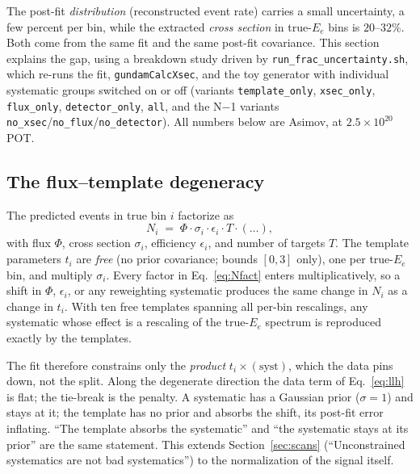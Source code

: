 \documentclass[11pt]{article}
\newcommand{\code}[1]{\texttt{#1}}
\begin{document}
The post-fit \emph{distribution} (reconstructed event rate) carries a small
uncertainty, a few percent per bin, while the extracted \emph{cross section} in
true-$E_e$ bins is $20$--$32\%$. Both come from the same fit and the same
post-fit covariance. This section explains the gap, using a breakdown study
driven by \code{run\_frac\_uncertainty.sh}, which re-runs the fit,
\code{gundamCalcXsec}, and the toy generator with individual systematic groups
switched on or off (variants \code{template\_only}, \code{xsec\_only},
\code{flux\_only}, \code{detector\_only}, \code{all}, and the N$-$1 variants
\code{no\_xsec}/\code{no\_flux}/\code{no\_detector}). All numbers below are
Asimov, at $2.5\times10^{20}$ POT.

\subsection{The flux--template degeneracy}

The predicted events in true bin $i$ factorize as
\begin{equation}
  N_i \;=\; \Phi \cdot \sigma_i \cdot \epsilon_i \cdot T \cdot (\dots),
  \label{eq:Nfact}
\end{equation}
with flux $\Phi$, cross section $\sigma_i$, efficiency $\epsilon_i$, and number
of targets $T$. The template parameters $t_i$ are \emph{free} (no prior
covariance; bounds $[0,3]$ only), one per true-$E_e$ bin, and multiply
$\sigma_i$. Every factor in Eq.~\eqref{eq:Nfact} enters multiplicatively, so a
shift in $\Phi$, $\epsilon_i$, or any reweighting systematic produces the same
change in $N_i$ as a change in $t_i$. With ten free templates spanning all
per-bin rescalings, any systematic whose effect is a rescaling of the
true-$E_e$ spectrum is reproduced exactly by the templates.

The fit therefore constrains only the \emph{product} $t_i\times(\text{syst})$,
which the data pins down, not the split. Along the degenerate direction the data
term of Eq.~\eqref{eq:llh} is flat; the tie-break is the penalty. A systematic
has a Gaussian prior ($\sigma=1$) and stays at it; the template has no prior and
absorbs the shift, its post-fit error inflating. ``The template absorbs the
systematic'' and ``the systematic stays at its prior'' are the same statement.
This extends Section~\ref{sec:scans} (``Unconstrained systematics are not bad
systematics'') to the normalization of the signal itself.
\end{document}
